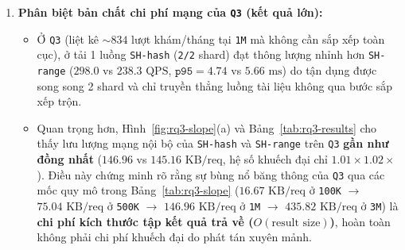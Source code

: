 \begin{enumerate}[leftmargin=0.8cm, itemsep=4pt]
  \item \textbf{Phân biệt bản chất chi phí mạng của \texttt{Q3} (kết quả lớn):}
  \begin{itemize}[leftmargin=0.6cm, itemsep=3pt]
    \item Ở \texttt{Q3} (liệt kê $\sim 834$ lượt khám/tháng tại \texttt{1M} mà không cần sắp xếp toàn cục), ở tải 1 luồng \texttt{SH-hash} (\texttt{2/2} shard) đạt thông lượng nhỉnh hơn \texttt{SH-range} ($298.0$ vs $238.3\text{ QPS}$, $\texttt{p95} = 4.74$ vs $5.66\text{ ms}$) do tận dụng được song song 2 shard và chỉ truyền thẳng luồng tài liệu không qua bước sắp xếp trộn.
    \item Quan trọng hơn, Hình~\ref{fig:rq3-slope}(a) và Bảng~\ref{tab:rq3-results} cho thấy lưu lượng mạng nội bộ của \texttt{SH-hash} và \texttt{SH-range} trên \texttt{Q3} \textbf{gần như đồng nhất} ($146.96$ vs $145.16\text{ KB/req}$, hệ số khuếch đại chỉ $1.01\times$\textendash $1.02\times$). Điều này chứng minh rõ rằng sự bùng nổ băng thông của \texttt{Q3} qua các mốc quy mô trong Bảng~\ref{tab:rq3-slope} ($16.67\text{ KB/req}$ ở \texttt{100K} $\rightarrow$ $75.04\text{ KB/req}$ ở \texttt{500K} $\rightarrow$ $146.96\text{ KB/req}$ ở \texttt{1M} $\rightarrow$ \textbf{$435.82\text{ KB/req}$} ở \texttt{3M}) là \textbf{chi phí kích thước tập kết quả trả về ($O(\text{result size})$)}, hoàn toàn không phải chi phí khuếch đại do phát tán xuyên mảnh.
  \end{itemize}


\end{enumerate}
